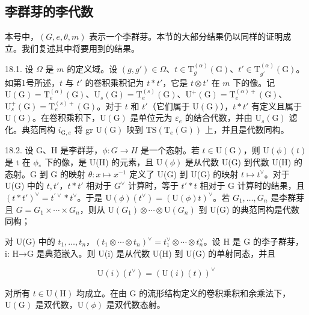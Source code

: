 \subsection{李群芽的李代数}

本号中，\((G, e, \theta, m)\) 表示一个李群芽。本节的大部分结果仍以同样的证明成立。我们复述其中将要用到的结果。

18.1. 设 \(\Omega\) 是 \(m\) 的定义域。设 \((g, g') \in \Omega\)、\(t \in \mathrm{T}_g^{(\alpha)}(\mathrm{G})\)、\(t' \in \mathrm{T}_{g'}^{(\alpha)}(\mathrm{G})\)。如第1号所述，\(t\) 与 \(t'\) 的卷积乘积记为 \(t * t'\)，它是 \(t \otimes t'\) 在 \(m\) 下的像。记 \(\mathrm{U}(\mathrm{G}) = \mathrm{T}_e^{(\alpha)}(\mathrm{G})\)、\(\mathrm{U}_s(\mathrm{G}) = \mathrm{T}_e^{(s)}(\mathrm{G})\)、\(\mathrm{U}^+(\mathrm{G}) = \mathrm{T}_e^{(\alpha)+}(\mathrm{G})\)、\(\mathrm{U}_s^+(\mathrm{G}) = \mathrm{T}_e^{(s)+}(\mathrm{G})\)。对于 \(t\) 和 \(t'\)（它们属于 \(\mathrm{U}(\mathrm{G})\)），\(t * t'\) 有定义且属于 \(\mathrm{U}(\mathrm{G})\)。在卷积乘积下，\(\mathrm{U}(\mathrm{G})\) 是单位元为 \(\varepsilon_e\) 的结合代数，并由 \(\mathrm{U}_s(\mathrm{G})\) 滤化。典范同构 \(i_{\mathrm{G}, e}\) 将 gr \(\mathrm{U}(\mathrm{G})\) 映到 \(\mathrm{TS}(\mathrm{T}_e(\mathrm{G}))\) 上，并且是代数同构。

18.2. 设 G、H 是李群芽，\(\phi: G \to H\) 是一个态射。若 \(t \in \mathrm{U}(\mathrm{G})\)，则 \(\mathrm{U}(\phi)(t)\) 是 t 在 \(\phi_{*}\) 下的像，是 U(H) 的元素，且 \(\mathrm{U}(\phi)\) 是从代数 U(G) 到代数 U(H) 的态射。G 到 G 的映射 \(\theta: x \mapsto x^{-1}\) 定义了 U(G) 到 U(G) 的映射 \(t \mapsto t^{\vee}\)。对于 U(G) 中的 \(t, t'\)，\(t * t'\) 相对于 \(G^{\vee}\) 计算时，等于 \(t' * t\) 相对于 G 计算时的结果，且 \((t * t')^{\vee} = t^{\prime\vee} * t^\vee\)。于是 \(\mathrm{U}(\phi)(t^{\vee}) = (\mathrm{U}(\phi)t)^{\vee}\)。若 \(G_{1}, \ldots, G_{n}\) 是李群芽且 \(G = G_{1} \times \cdots \times G_{n}\)，则从 \(\mathrm{U}(G_{1}) \otimes \cdots \otimes \mathrm{U}(G_{n})\) 到 U(G) 的典范同构是代数同构；

对 U(G) 中的 \(t_{1},\ldots,t_{n}\)，\((t_{1}\otimes\cdots\otimes t_{n})^{\vee}=t_{1}^{\vee}\otimes\cdots\otimes t_{n}^{\vee}\)。设 H 是 G 的李子群芽，i: H→G 是典范嵌入。则 U(i) 是从代数 U(H) 到 U(G) 的单射同态，并且

\[
\mathrm{U} (i) \left(t ^ {\vee}\right) = \left(\mathrm{U} (i) (t)\right) ^ {\vee}
\]

对所有 \(t \in \mathrm{U}(\mathrm{H})\) 均成立。在由 G 的流形结构定义的卷积乘积和余乘法下，\(\mathrm{U}(\mathrm{G})\) 是双代数，\(\mathrm{U}(\phi)\) 是双代数态射。

